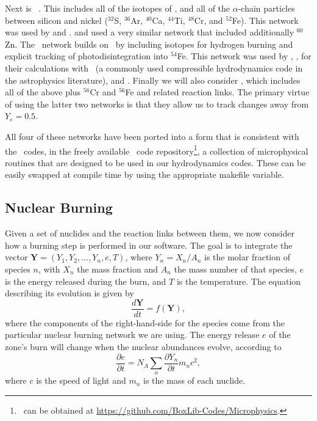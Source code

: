 \documentclass[12pt]{article}
\begin{document}
Next is \aproxthirteen\ \citep{timmes:1999,timmes:2000}. This includes
all of the isotopes of \isoseven, and all of the $\alpha$-chain particles between
silicon and nickel (${}^{32}$S, ${}^{36}$Ar, ${}^{40}$Ca, ${}^{44}$Ti, ${}^{48}$Cr,
and ${}^{52}$Fe). This network was used by \citet{hawley:2012} and \citet{raskin:2010}.
\citet{loren-aguilar:2010} and \citet{garcia-senz:2013} used a very similar network
that included additionally ${}^{60}$Zn. The \aproxnineteen\ network \citep{timmes:1999}
builds on \aproxthirteen\ by including isotopes for hydrogen burning and explicit
tracking of photodisintegration into ${}^{54}$Fe. This network was used by
\citet{kushnir:2013}, \citet{kushnir:2014}, \citet{rosswog:2009} for their
calculations with \flash\ (a commonly used compressible hydrodynamics code
in the astrophysics literature), and \citet{papish:2015}. Finally we will also
consider \aproxtwentyone, which includes all of the above plus ${}^{56}$Cr
and ${}^{56}$Fe and related reaction links. The primary virtue of using
the latter two networks is that they allow us to track changes away from
$Y_e = 0.5$.

All four of these networks have been ported into a form that is consistent
with the \boxlib\ codes, in the freely available \microphysics\ code
repository\footnote{\microphysics\ can be obtained at \url{https://github.com/BoxLib-Codes/Microphysics}.},
a collection of microphysical routines that are designed to be used in our
hydrodynamics codes. These can be easily swapped at compile time by using the 
appropriate makefile variable.



\subsection{Nuclear Burning}
\label{sec:burning}

Given a set of nuclides and the reaction links between them, we now consider
how a burning step is performed in our software. The goal is to integrate the
vector ${\bm{Y}} = (Y_1, Y_2, \ldots, Y_n, e, T)$, where $Y_{n} = X_{n} / A_{n}$
is the molar fraction of species $n$, with $X_n$ the mass fraction and $A_n$ the
mass number of that species, $e$ is the energy released during the burn, and
$T$ is the temperature. The equation describing its evolution is given by
\begin{equation}
  \frac{d\bm{Y}}{dt} = f(\mathbf{Y}),
\end{equation}
where the components of the right-hand-side for the species come from the particular
nuclear burning network we are using. The energy release $e$ of the zone's burn
will change when the nuclear abundances evolve, according to
\begin{equation}
  \frac{\partial e}{\partial t} = N_A \sum_{n} \frac{\partial Y_{n}}{\partial t} m_{n} c^2,
\end{equation}
where $c$ is the speed of light and $m_n$ is the mass of each nuclide.
\end{document}
